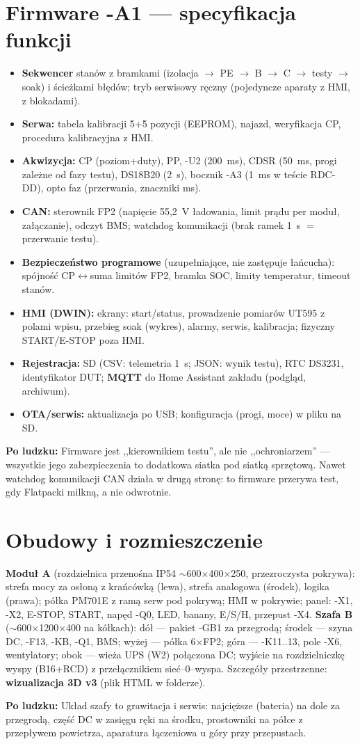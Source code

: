 \documentclass[11pt,a4paper]{article}
\newcommand{\why}[1]{\par\smallskip\noindent\colorbox{blue!6}{\parbox{0.965\linewidth}{\small\textbf{Po ludzku:} #1}}\par\smallskip}
\begin{document}
\section{Firmware -A1 --- specyfikacja funkcji}
\begin{itemize}
\item \textbf{Sekwencer} stanów z bramkami (izolacja $\to$ PE $\to$ B $\to$ C $\to$ testy $\to$
soak) i ścieżkami błędów; tryb serwisowy ręczny (pojedyncze aparaty z HMI, z blokadami).
\item \textbf{Serwa:} tabela kalibracji 5+5 pozycji (EEPROM), najazd, weryfikacja CP, procedura
kalibracyjna z HMI.
\item \textbf{Akwizycja:} CP (poziom+duty), PP, -U2 (200~ms), CDSR (50~ms, progi zależne od fazy
testu), DS18B20 (2~s), bocznik -A3 (1~ms w teście RDC-DD), opto faz (przerwania, znaczniki ms).
\item \textbf{CAN:} sterownik FP2 (napięcie 55,2~V ładowania, limit prądu per moduł, załączanie),
odczyt BMS; watchdog komunikacji (brak ramek 1~s $=$ przerwanie testu).
\item \textbf{Bezpieczeństwo programowe} (uzupełniające, nie zastępuje łańcucha): spójność
CP$\leftrightarrow$suma limitów FP2, bramka SOC, limity temperatur, timeout stanów.
\item \textbf{HMI (DWIN):} ekrany: start/status, prowadzenie pomiarów UT595 z polami wpisu,
przebieg soak (wykres), alarmy, serwis, kalibracja; fizyczny START/E-STOP poza HMI.
\item \textbf{Rejestracja:} SD (CSV: telemetria 1~s; JSON: wynik testu), RTC DS3231, identyfikator
DUT; \textbf{MQTT} do Home Assistant zakładu (podgląd, archiwum).
\item \textbf{OTA/serwis:} aktualizacja po USB; konfiguracja (progi, moce) w pliku na SD.
\end{itemize}
\why{Firmware jest ,,kierownikiem testu'', ale nie ,,ochroniarzem'' --- wszystkie jego
zabezpieczenia to dodatkowa siatka pod siatką sprzętową. Nawet watchdog komunikacji CAN działa
w drugą stronę: to firmware przerywa test, gdy Flatpacki milkną, a nie odwrotnie.}

\section{Obudowy i rozmieszczenie}
\textbf{Moduł A} (rozdzielnica przenośna IP54 $\sim$600$\times$400$\times$250, przezroczysta
pokrywa): strefa mocy za osłoną z krańcówką (lewa), strefa analogowa (środek), logika (prawa);
półka PM701E z ramą serw pod pokrywą; HMI w pokrywie; panel: -X1, -X2, E-STOP, START, napęd -Q0,
LED, banany, E/S/H, przepust -X4. \textbf{Szafa B} ($\sim$600$\times$1200$\times$400 na kółkach):
dół --- pakiet -GB1 za przegrodą; środek --- szyna DC, -F13, -KB, -Q1, BMS; wyżej --- półka
6$\times$FP2; góra --- -K11..13, pole -X6, wentylatory; obok --- wieża UPS (W2) połączona DC;
wyjście na rozdzielniczkę wyspy (B16+RCD) z przełącznikiem sieć--0--wyspa. Szczegóły przestrzenne:
\textbf{wizualizacja 3D v3} (plik HTML w folderze).
\why{Układ szafy to grawitacja i serwis: najcięższe (bateria) na dole za przegrodą, część DC
w zasięgu ręki na środku, prostowniki na półce z przepływem powietrza, aparatura łączeniowa
u góry przy przepustach.}
\end{document}
